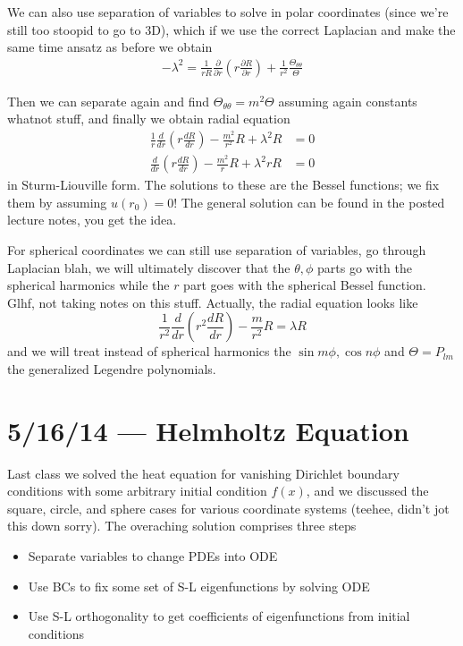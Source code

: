 \documentclass[10pt]{report}
\newcommand{\rd}[2]{\frac{d#1}{d#2}}
\newcommand{\pd}[2]{\frac{\partial #1}{\partial#2}}
\begin{document}
We can also use separation of variables to solve in polar coordinates (since we're still too stoopid to go to 3D), which if we use the correct Laplacian and make the same time ansatz as before we obtain
\begin{align}
    -\lambda^2 = \frac{1}{rR}\pd{}{r}\left( r \pd{R}{r} \right) + \frac{1}{r^2}\frac{\Theta_{\theta\theta}}{\Theta}
\end{align}

Then we can separate again and find $\Theta_{\theta\theta} = m^2\Theta$ assuming again constants whatnot stuff, and finally we obtain radial equation
\begin{align}
    \frac{1}{r}\rd{}{r}\left( r\rd{R}{r} \right) - \frac{m^2}{r^2}R + \lambda^2 R &= 0\\
    \rd{}{r}\left( r\rd{R}{r} \right) - \frac{m^2}{r}R + \lambda^2 rR &= 0
\end{align}
in Sturm-Liouville form. The solutions to these are the Bessel functions; we fix them by assuming $u(r_0) = 0$! The general solution can be found in the posted lecture notes, you get the idea.

For spherical coordinates we can still use separation of variables, go through Laplacian blah, we will ultimately discover that the $\theta, \phi$ parts go with the spherical harmonics while the $r$ part goes with the spherical Bessel function. Glhf, not taking notes on this stuff. Actually, the radial equation looks like
\begin{equation}
    \frac{1}{r^2}\rd{}{r}\left( r^2 \rd{R}{r} \right) - \frac{m}{r^2}R = \lambda R
\end{equation}
and we will treat instead of spherical harmonics the $\sin m\phi, \cos n\phi$ and $\Theta = P_{lm}$ the generalized Legendre polynomials.

\chapter{5/16/14 --- Helmholtz Equation}

Last class we solved the heat equation for vanishing Dirichlet boundary conditions with some arbitrary initial condition $f(x)$, and we discussed the square, circle, and sphere cases for various coordinate systems (teehee, didn't jot this down sorry). The overaching solution comprises three steps
\begin{itemize}
    \item Separate variables to change PDEs into ODE
    \item Use BCs to fix some set of S-L eigenfunctions by solving ODE
    \item Use S-L orthogonality to get coefficients of eigenfunctions from initial conditions
\end{itemize}
\end{document}
